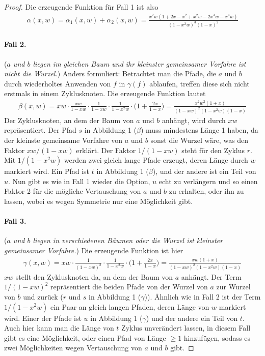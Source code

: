 \documentclass[a4paper, 10pt, ngerman]{article}
\begin{document}
\begin{proof}
    Die erzeugende Funktion für Fall 1 ist also
    \begin{align*}
        \alpha(x, w)
        = \alpha_1(x, w) + \alpha_2(x, w)
        = \frac {x^2w(1 + 2x - x^2 + x^2w - 2x^3w - x^4w)} {(1 - x^2w)^3(1 - x)^2}
    \end{align*}

    \paragraph*{Fall 2.} (\emph{$a$ und $b$ liegen im gleichen Baum und ihr kleinster gemeinsamer Vorfahre ist nicht die Wurzel.}) Anders formuliert: Betrachtet man die Pfade, die $a$ und $b$ durch wiederholtes Anwenden von $f$ in $\gamma(f)$ ablaufen, treffen diese sich nicht erstmals in einem Zyklusknoten. Die erzeugende Funktion lautet
    \begin{align*}
        \beta(x, w)
        = xw \cdot \frac {xw} {1 - xw} \cdot \frac {1} {1 - xw} \cdot \frac {1} {1 - x^2w} \cdot \Bigg (1 + \frac {2x} {1 - x} \Bigg )
        = \frac {x^2w^2(1 + x)} {(1 - xw)^2(1 - x^2w)(1 - x)}
    \end{align*}
    Der Zyklusknoten, an dem der Baum von $a$ und $b$ anhängt, wird durch $xw$ repräsentiert. Der Pfad $s$ in Abbildung 1 ($\beta$) muss mindestens Länge 1 haben, da der kleinste gemeinsame Vorfahre von $a$ und $b$ sonst die Wurzel wäre, was den Faktor $xw/(1 - xw)$ erklärt. Der Faktor $1/(1 - xw)$ steht für den Zyklus $r$. Mit $1/(1 - x^2w)$ werden zwei gleich lange Pfade erzeugt, deren Länge durch $w$ markiert wird. Ein Pfad ist $t$ in Abbildung 1 ($\beta$), und der andere ist ein Teil von $u$. Nun gibt es wie in Fall 1 wieder die Option, $u$ echt zu verlängern und so einen Faktor 2 für die mögliche Vertauschung von $a$ und $b$ zu erhalten, oder ihn zu lassen, wobei es wegen Symmetrie nur eine Möglichkeit gibt.

    \paragraph{Fall 3.} (\emph{$a$ und $b$ liegen in verschiedenen Bäumen oder die Wurzel ist kleinster gemeinsamer Vorfahre.}) Die erzeugende Funktion ist hier
    \begin{align*}
        \gamma(x, w)
        = xw \cdot \frac {1} {(1 - xw)^2} \cdot \frac {1} {1 - x^2w} \cdot \Bigg (1 + \frac {2x}{1 - x} \Bigg )
        = \frac {xw(1 + x)} {(1 - xw)^2(1 - x^2w)(1 - x)}
    \end{align*}
    $xw$ stellt den Zyklusknoten da, an dem der Baum von $a$ anhängt. Der Term $1/(1 - xw)^2$ repräsentiert die beiden Pfade von der Wurzel von $a$ zur Wurzel von $b$ und zurück ($r$ und $s$ in Abbildung 1 ($\gamma$)). Ähnlich wie in Fall 2 ist der Term $1/(1 - x^2w)$ ein Paar an gleich langen Pfaden, deren Länge von $w$ markiert wird. Einer der Pfade ist $u$ in Abbildung 1 ($\gamma$) und der andere ein Teil von $t$. Auch hier kann man die Länge von $t$ Zyklus unverändert lassen, in diesem Fall gibt es eine Möglichkeit, oder einen Pfad von Länge $\ge 1$ hinzufügen, sodass es zwei Möglichkeiten wegen Vertauschung von $a$ und $b$ gibt.


\end{proof}
\end{document}
